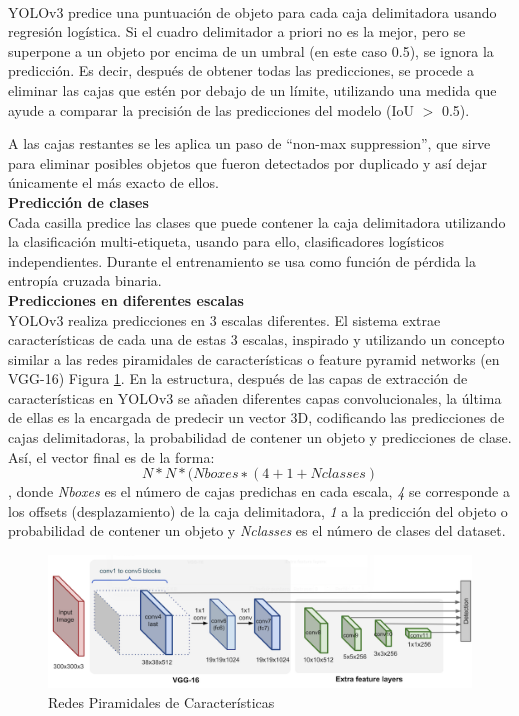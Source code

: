 \\ \break
YOLOv3 predice una puntuación de objeto para cada caja delimitadora usando regresión logística. Si el cuadro delimitador a priori no es la mejor, pero se superpone a un objeto por encima de un umbral (en este caso 0.5), se ignora la predicción. Es decir, después de obtener todas las predicciones, se procede a eliminar las cajas que estén por debajo de un límite, utilizando una medida que ayude a comparar la precisión de las predicciones del modelo (IoU $>$ 0.5).

A las cajas restantes se les aplica un paso de “non-max suppression”, que sirve para eliminar posibles objetos que fueron detectados por duplicado y así dejar únicamente el más exacto de ellos. \\


\textbf{Predicción de clases} \\

Cada casilla predice las clases que puede contener la caja delimitadora utilizando la clasificación multi-etiqueta, usando para ello, clasificadores logísticos independientes. Durante el entrenamiento se usa como función de pérdida la entropía cruzada binaria. \\


\textbf{Predicciones en diferentes escalas} \\

YOLOv3 realiza predicciones en 3 escalas diferentes. El sistema extrae características de cada una de estas 3 escalas, inspirado y utilizando un concepto similar a las redes piramidales de características o feature pyramid networks \cite{featurepiramid} (en VGG-16) Figura \ref{fig:vgg-16}. En la estructura, después de las capas de extracción de características en YOLOv3 se añaden diferentes capas convolucionales, la última de ellas es la encargada de predecir un vector 3D, codificando las predicciones de cajas delimitadoras, la probabilidad de contener un objeto y predicciones de clase. Así, el vector final es de la forma: \[N * N * (Nboxes ∗ (4 + 1 + Nclasses)\], donde \textit{Nboxes} es el número de cajas predichas en cada escala, \textit{4} se corresponde a los offsets (desplazamiento) de la caja delimitadora, \textit{1} a la predicción del objeto o probabilidad de contener un objeto y \textit{Nclasses} es el número de clases del dataset.

\begin{figure}
    \centering
    \includegraphics[width=1\textwidth]{img/VGG-16-NetPriamidal.png}
    \caption{Redes Piramidales de Características}
    \label{fig:vgg-16}
\end{figure}

